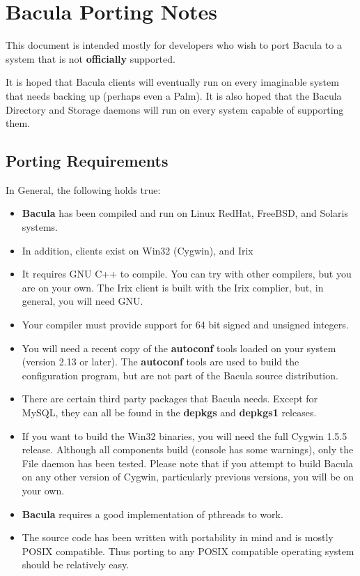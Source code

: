 
\section*{Bacula Porting Notes}
\label{_ChapterStart1}

This document is intended mostly for developers who wish to port Bacula to a
system that is not {\bf officially} supported. 

It is hoped that Bacula clients will eventually run on every imaginable system
that needs backing up (perhaps even a Palm). It is also hoped that the Bacula
Directory and Storage daemons will run on every system capable of supporting
them. 

\subsection*{Porting Requirements}

In General, the following holds true: 

\begin{itemize}
\item {\bf Bacula} has been compiled and run on Linux RedHat, FreeBSD,  and
   Solaris systems. 
\item In addition, clients exist on Win32 (Cygwin), and Irix 
\item It requires GNU C++ to compile. You can try with other compilers, but 
   you are on your own. The Irix client is built with the Irix complier,  but, in
   general, you will need GNU. 
\item Your compiler must provide support for 64 bit signed and unsigned 
   integers. 
\item You will need a recent copy of the {\bf autoconf} tools loaded  on your
   system (version 2.13 or later). The {\bf autoconf} tools  are used to build
   the configuration program, but are not part of  the Bacula source
distribution. 
\item There are certain third party packages that Bacula needs. Except  for
   MySQL, they can all be found in the {\bf depkgs} and  {\bf depkgs1} releases. 
\item If you want to build the Win32 binaries, you will need the  full Cygwin
   1.5.5 release. Although all components build (console  has some warnings),
   only the File daemon has been tested.  Please note that if you attempt to
build Bacula on any other  version of Cygwin, particularly previous versions,
you will  be on your own. 
\item {\bf Bacula} requires a good implementation of pthreads to work. 
\item The source code has been written with portability in mind and is  mostly
   POSIX compatible. Thus porting to any POSIX compatible operating  system
   should be relatively easy. 
\end{itemize}

